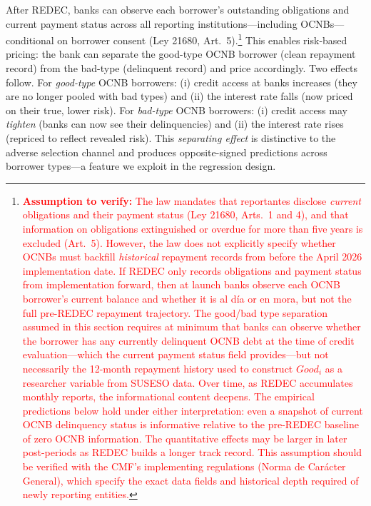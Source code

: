 \documentclass[12pt]{article}
\theoremstyle{plain}
\theoremstyle{plain}
\begin{document}
After REDEC, banks can observe each borrower's outstanding obligations and current payment status across all reporting institutions---including OCNBs---conditional on borrower consent (Ley 21680, Art.\ 5).\footnote{\textcolor{red}{\textbf{Assumption to verify:} The law mandates that reportantes disclose \textit{current} obligations and their payment status (Ley 21680, Arts.\ 1 and 4), and that information on obligations extinguished or overdue for more than five years is excluded (Art.\ 5). However, the law does not explicitly specify whether OCNBs must backfill \textit{historical} repayment records from before the April 2026 implementation date. If REDEC only records obligations and payment status from implementation forward, then at launch banks observe each OCNB borrower's current balance and whether it is al d\'ia or en mora, but not the full pre-REDEC repayment trajectory. The good/bad type separation assumed in this section requires at minimum that banks can observe whether the borrower has any currently delinquent OCNB debt at the time of credit evaluation---which the current payment status field provides---but not necessarily the 12-month repayment history used to construct $Good_i$ as a researcher variable from SUSESO data. Over time, as REDEC accumulates monthly reports, the informational content deepens. The empirical predictions below hold under either interpretation: even a snapshot of current OCNB delinquency status is informative relative to the pre-REDEC baseline of zero OCNB information. The quantitative effects may be larger in later post-periods as REDEC builds a longer track record. This assumption should be verified with the CMF's implementing regulations (Norma de Car\'acter General), which specify the exact data fields and historical depth required of newly reporting entities.}} This enables risk-based pricing: the bank can separate the good-type OCNB borrower (clean repayment record) from the bad-type (delinquent record) and price accordingly. Two effects follow. For \textit{good-type} OCNB borrowers: (i) credit access at banks increases (they are no longer pooled with bad types) and (ii) the interest rate falls (now priced on their true, lower risk). For \textit{bad-type} OCNB borrowers: (i) credit access may \textit{tighten} (banks can now see their delinquencies) and (ii) the interest rate rises (repriced to reflect revealed risk). This \textit{separating effect} is distinctive to the adverse selection channel and produces opposite-signed predictions across borrower types---a feature we exploit in the regression design.
\end{document}
